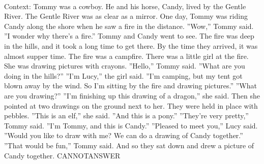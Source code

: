 \documentclass[11pt,a4paper, onecolumn]{article}
\begin{document}
\\ Context: Tommy was a cowboy. He and his horse, Candy, lived by the Gentle River. The Gentle River was as clear as a mirror. One day, Tommy was riding Candy along the shore when he saw a fire in the distance. ''Wow,'' Tommy said. ''I wonder why there's a fire.'' Tommy and Candy went to see. The fire was deep in the hills, and it took a long time to get there. By the time they arrived, it was almost supper time. The fire was a campfire. There was a little girl at the fire. She was drawing pictures with crayons. ''Hello,'' Tommy said. ''What are you doing in the hills?'' ''I'm Lucy,'' the girl said. ''I'm camping, but my tent got blown away by the wind. So I'm sitting by the fire and drawing pictures.'' ''What are you drawing?'' ''I'm finishing up this drawing of a dragon,'' she said. Then she pointed at two drawings on the ground next to her. They were held in place with pebbles. ''This is an elf,'' she said. ''And this is a pony.'' ''They're very pretty,'' Tommy said. ''I'm Tommy, and this is Candy.'' ''Pleased to meet you,'' Lucy said. ''Would you like to draw with me? We can do a drawing of Candy together.'' ''That would be fun,'' Tommy said. And so they sat down and drew a picture of Candy together. CANNOTANSWER
\end{document}
